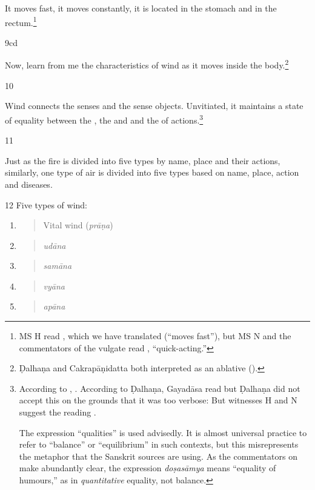 \begin{translation}
It moves fast, it moves constantly, it is located in the stomach and
in the rectum.\footnote{MS H read , which we have translated 
(“moves fast”), but MS N and the commentators of the vulgate read 
, “quick-acting.”}

\item[9cd] 

Now, learn from me the characteristics of wind as it moves inside the
body.\footnote{Ḍalhaṇa and Cakrapāṇidatta both interpreted  as an 
ablative ().}

\item[10] 

Wind connects the senses and the sense objects.  Unvitiated, it
maintains a state of equality between the , the
 and  and the
 of actions.\footnote{According to
    , . 
    According to Ḍalhaṇa,
    Gayadāsa read  but 
    Ḍalhaṇa did not accept
    this on the grounds that it was too verbose:  But witnesses H and N suggest the reading
    .  
    
    The expression “qualities” is used advisedly. It is almost
universal practice to refer to “balance” or “equilibrium” in such
contexts, but this misrepresents the metaphor that the Sanskrit
sources are using. As the commentators on \AH\ 
make abundantly clear, the expression \emph{doṣasāmya} means
“equality of humours,” as in \emph{quantitative} equality, not
balance.}

\item[11] 

Just as the fire is divided into five types by name, place and their actions, similarly, one type of air is divided into five
types based on name, place, action and diseases.

\item[12] Five types of wind:

\begin{enumerate}
\def\labelenumi{\arabic{enumi}.}
\item
\begin{quote}
Vital wind (\emph{prāṇa})
\end{quote}
\item
\begin{quote}
\emph{udāna }
\end{quote}
\item
\begin{quote}
\emph{samāna}
\end{quote}
\item
\begin{quote}
\emph{vyāna}
\end{quote}
\item
\begin{quote}
\emph{apāna}
\end{quote}
\end{enumerate}


\end{translation}
